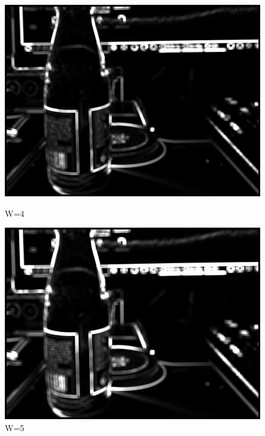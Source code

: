 \documentclass[11pt]{jarticle}
\begin{document}
\begin{figure}[h]
    \begin{minipage}{0.5\hsize}
        \centering
        \includegraphics[scale=.3]{w4.jpg}
        \caption{W=4}
    \end{minipage}
    \begin{minipage}{0.5\hsize}
        \centering
        \includegraphics[scale=.3]{w5.jpg}
        \caption{W=5}
    \end{minipage}
\end{figure}
\end{document}
